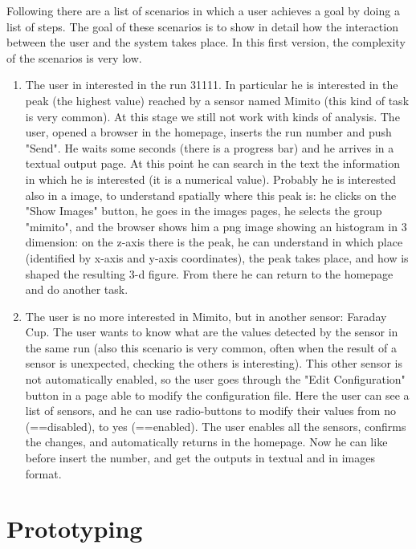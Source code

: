 Following there are a list of scenarios in which a user achieves a goal by doing a list of steps. The goal of these scenarios is to show in detail how the interaction between the user and the system takes place. In this first version, the complexity of the scenarios is very low. 

\begin{enumerate}

\item The user in interested in the run 31111. In particular he is interested in the peak (the highest value) reached by a sensor named Mimito (this kind of task is very common). At this stage we still not work with kinds of analysis. The user, opened a browser in the homepage, inserts the run number and push "Send". He waits some seconds (there is a progress bar) and he arrives in a textual output page. At this point he can search in the text the information in which he is interested (it is a numerical value). Probably he is interested also in a image, to understand spatially where this peak is: he clicks on the "Show Images" button, he goes in the images pages, he selects the group "mimito", and the browser shows him a png image showing an histogram in 3 dimension: on the z-axis there is the peak, he can understand in which place (identified by x-axis and y-axis coordinates), the peak takes place, and how is shaped the resulting 3-d figure. From there he can return to the homepage and do another task.   

\item The user is no more interested in Mimito, but in another sensor: Faraday Cup. The user wants to know what are the values detected by the sensor in the same run (also this scenario is very common, often when the result of a sensor is unexpected, checking the others is interesting). This other sensor is not automatically enabled, so the user goes through the "Edit Configuration" button in a page able to modify the configuration file. Here the user can see a list of sensors, and he can use radio-buttons to modify their values from no (==disabled), to yes (==enabled). The user enables all the sensors, confirms the changes, and automatically returns in the homepage. Now he can like before insert the number, and get the outputs in textual and in images format.  



\end{enumerate}


\section{Prototyping}

